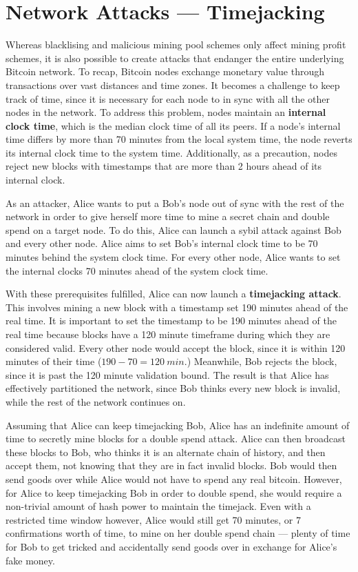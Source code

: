 \documentclass[full.tex]{subfiles}
\begin{document}
    \section*{Network Attacks --- Timejacking}
    
    Whereas blacklising and malicious mining pool schemes only affect mining profit schemes, it is also possible to create attacks that endanger the entire underlying Bitcoin network. 
    To recap, Bitcoin nodes exchange monetary value through transactions over vast distances and time zones. It becomes a challenge to keep track of time, since it is necessary for each node to in sync with all the other nodes in the network. To address this problem, nodes maintain an \textbf{internal clock time}, which is the median clock time of all its peers. If a node's internal time differs by more than 70 minutes from the local system time, the node reverts its internal clock time to the system time. Additionally, as a precaution, nodes reject new blocks with timestamps that are more than 2 hours ahead of its internal clock.
    
    As an attacker, Alice wants to put a Bob's node out of sync with the rest of the network in order to give herself more time to mine a secret chain and double spend on a target node. To do this, Alice can launch a sybil attack against Bob and every other node. Alice aims to set Bob's internal clock time to be 70 minutes behind the system clock time. For every other node, Alice wants to set the internal clocks 70 minutes ahead of the system clock time.
    
    With these prerequisites fulfilled, Alice can now launch a \textbf{timejacking attack}. This involves mining a new block with a timestamp set 190 minutes ahead of the real time. It is important to set the timestamp to be 190 minutes ahead of the real time because blocks have a 120 minute timeframe during which they are considered valid. Every other node would accept the block, since it is within 120 minutes of their time ($190 - 70 = 120~min$.) Meanwhile, Bob rejects the block, since it is past the 120 minute validation bound. The result is that Alice has effectively partitioned the network, since Bob thinks every new block is invalid, while the rest of the network continues on.
    
    Assuming that Alice can keep timejacking Bob, Alice has an indefinite amount of time to secretly mine blocks for a double spend attack. Alice can then broadcast these blocks to Bob, who thinks it is an alternate chain of history, and then accept them, not knowing that they are in fact invalid blocks. Bob would then send goods over while Alice would not have to spend any real bitcoin. However, for Alice to keep timejacking Bob in order to double spend, she would require a non-trivial amount of hash power to maintain the timejack. Even with a restricted time window however, Alice would still get 70 minutes, or 7 confirmations worth of time, to mine on her double spend chain --- plenty of time for Bob to get tricked and accidentally send goods over in exchange for Alice's fake money.
    
\end{document}
